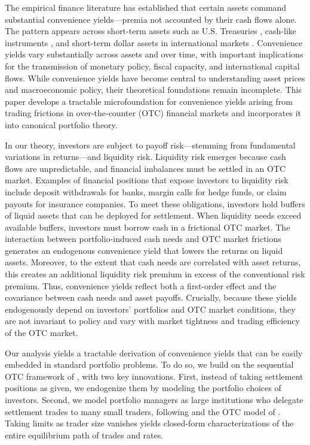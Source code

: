 \documentclass[12pt,american,english,notitlepage]{article}
\begin{document}
The empirical finance literature has established that certain assets command
substantial convenience yields---premia not accounted by their cash flows alone. The pattern appears across short-term assets
such as U.S. Treasuries \citep{Krishnamurthy2012}, cash-like instruments
\citep{Nagel2016}, and short-term dollar assets in international markets
\citep{JiangKrishnamurthyLustig2021,EngelWu2023}. Convenience yields
vary substantially across assets and over time, with important
implications for the transmission of monetary policy, fiscal capacity, and
international capital flows. While convenience yields have become
central to understanding asset prices and macroeconomic policy, their
theoretical foundations remain incomplete. This paper develops a tractable microfoundation for convenience yields arising from trading frictions in over-the-counter (OTC) financial markets and incorporates it into canonical portfolio theory.

In our theory, investors are subject to payoff risk---stemming from fundamental variations in returns---and liquidity risk. Liquidity risk emerges because cash flows are unpredictable, and financial imbalances must be settled in an OTC market. Examples of financial
positions that expose investors to liquidity risk include deposit withdrawals for banks, margin calls for hedge funds,
or claim payouts for insurance companies. To meet these obligations,
investors hold buffers of liquid assets that can be deployed for settlement.
When liquidity needs exceed available buffers, investors must borrow
cash in a frictional OTC market. 
The interaction
between portfolio-induced cash needs and OTC market frictions
generates an endogenous convenience yield that lowers the returns
on liquid assets. Moreover, to the extent that cash needs are correlated with
asset returns, this creates an additional liquidity risk
premium in excess of the conventional risk premium. Thus, convenience yields
reflect both a first-order effect and the covariance between
cash needs and asset payoffs. Crucially, because these yields endogenously depend on investors' portfolios and OTC market conditions, they are not
invariant to policy and vary with market tightness and trading efficiency
of the OTC market.

Our analysis yields a tractable derivation of convenience yields that can be easily embedded in standard portfolio problems. To do so, we build on the sequential OTC framework of \citet*{AL15-ECMA},   with two key innovations.
First, instead of taking settlement positions as
given, we endogenize them by modeling the portfolio choices of investors. Second, we model portfolio managers as large institutions who delegate
settlement trades to many small traders, following \citet{Shi1997}
and the OTC model of \citet*{AEW15}. Taking limits as trader size
vanishes yields closed-form characterizations of the entire equilibrium
path of trades and rates.
\end{document}
